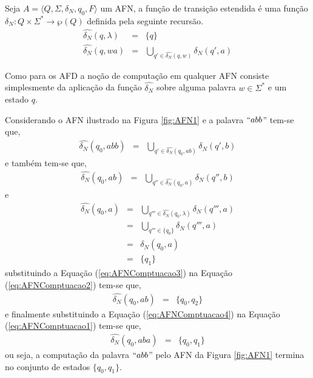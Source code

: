 \begin{definition}\label{def:FuncaoDeltaNDEstendida}
	Seja $A = \langle Q, \Sigma, \delta_N, q_0, F\rangle$ um AFN, a função de transição estendida é uma função $\delta_N: Q \times \Sigma^* \rightarrow \wp(Q)$ definida pela seguinte recursão.
	\begin{eqnarray}\label{eq:FuncaoDeltaNDEstendida}
		\widehat{\delta_N}(q, \lambda)& = & \{q\} \\
		\widehat{\delta_N}(q, wa)& = & \bigcup_{q' \in \widehat{\delta_N}(q, w)} \delta_N(q', a)
	\end{eqnarray}
\end{definition}

Como para os AFD a noção de computação em qualquer AFN consiste simplesmente da aplicação da função $\widehat{\delta_N}$ sobre alguma palavra $w \in \Sigma^*$ e um estado $q$. 

\begin{example}\label{exe:ComputacaoAFN}
	Considerando o AFN ilustrado na Figura \ref{fig:AFN1} e a palavra $``abb$'' tem-se que,
	\begin{eqnarray}\label{eq:AFNComptuacao1}
		\widehat{\delta_N}(q_0, abb) & = & \bigcup_{q' \in \widehat{\delta_N}(q_0, ab)} \delta_N(q', b)
	\end{eqnarray}
	e também tem-se que, 
	\begin{eqnarray}\label{eq:AFNComptuacao2}
		\widehat{\delta_N}(q_0, ab) & = & \bigcup_{q'' \in \widehat{\delta_N}(q_0, a)} \delta_N(q'', b)
	\end{eqnarray}
	e
	\begin{eqnarray}\label{eq:AFNComptuacao3}
		\widehat{\delta_N}(q_0, a) & = & \bigcup_{q''' \in \widehat{\delta_N}(q_0, \lambda)} \delta_N(q''', a) \nonumber \\ 
		& = & \bigcup_{q''' \in \{q_0\}} \delta_N(q''', a) \\
		& = & \delta_N(q_0, a) \nonumber \\ 
		& = & \{q_1\} \nonumber
	\end{eqnarray}
	substituindo a Equação (\ref{eq:AFNComptuacao3}) na Equação (\ref{eq:AFNComptuacao2}) tem-se que, 
	\begin{eqnarray}\label{eq:AFNComptuacao4}
		\widehat{\delta_N}(q_0, ab) & = & \{q_0, q_2\}
	\end{eqnarray}
	e finalmente substituindo a Equação (\ref{eq:AFNComptuacao4}) na Equação (\ref{eq:AFNComptuacao1}) tem-se que,
	\begin{eqnarray}
		\widehat{\delta_N}(q_0, aba) & = & \{q_0, q_1\}
	\end{eqnarray}
	ou seja, a computação da palavra $``abb$'' pelo AFN da Figura \ref{fig:AFN1} termina no conjunto de estados $\{q_0, q_1\}$.
\end{example}

